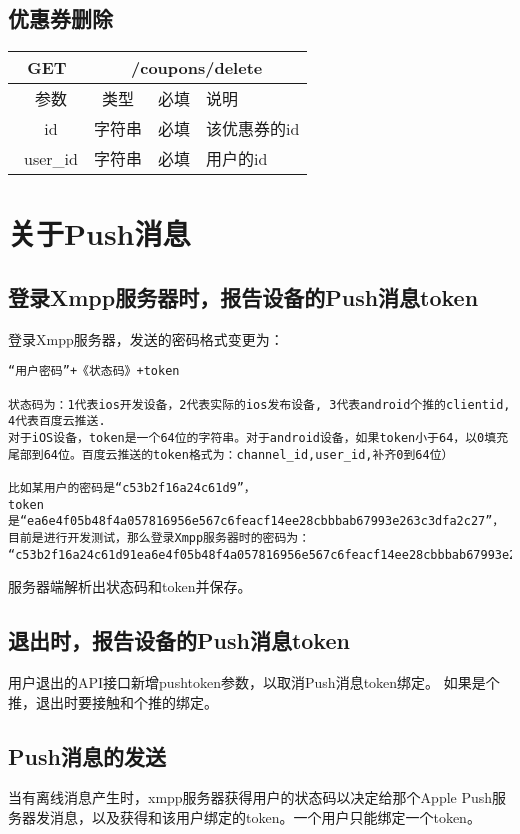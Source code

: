 \subsection{优惠券删除}


\begin{table}[H]
   \begin{center}
\begin{tabular}{|c|c|c|p{12cm}|}
\hline
GET & \multicolumn{3}{|c|}{/coupons/delete} \\
\hline\hline
 \  参数  & 类型 & 必填 &  说明  \\
\hline
 \  id  & 字符串 & 必填 &  该优惠券的id  \\
\hline
 \  user\_id  & 字符串 & 必填 &  用户的id  \\ 
\hline
\end{tabular}
   \end{center}
\end{table}





\section{关于Push消息}

\subsection{登录Xmpp服务器时，报告设备的Push消息token}
登录Xmpp服务器，发送的密码格式变更为：

\begin{verbatim}
“用户密码”+《状态码》+token

状态码为：1代表ios开发设备，2代表实际的ios发布设备, 3代表android个推的clientid, 4代表百度云推送.
对于iOS设备，token是一个64位的字符串。对于android设备，如果token小于64，以0填充尾部到64位。百度云推送的token格式为：channel_id,user_id,补齐0到64位）

比如某用户的密码是“c53b2f16a24c61d9”，
token是“ea6e4f05b48f4a057816956e567c6feacf14ee28cbbbab67993e263c3dfa2c27”，
目前是进行开发测试，那么登录Xmpp服务器时的密码为：
“c53b2f16a24c61d91ea6e4f05b48f4a057816956e567c6feacf14ee28cbbbab67993e263c3dfa2c27”。
\end{verbatim}

服务器端解析出状态码和token并保存。


\subsection{退出时，报告设备的Push消息token}

用户退出的API接口新增pushtoken参数，以取消Push消息token绑定。
如果是个推，退出时要接触和个推的绑定。

\subsection{Push消息的发送}
当有离线消息产生时，xmpp服务器获得用户的状态码以决定给那个Apple Push服务器发消息，以及获得和该用户绑定的token。一个用户只能绑定一个token。
